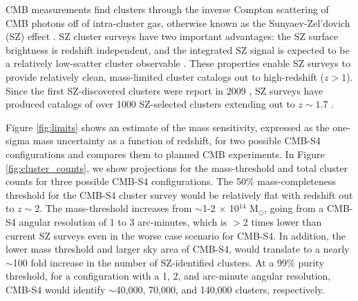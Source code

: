 CMB measurements find clusters through the inverse Compton scattering of CMB photons off of intra-cluster gas, otherwise 
known as the Sunyaev-Zel'dovich (SZ) effect \cite{sunyaev72}. SZ cluster surveys have two important advantages: 
the SZ surface brightness is redshift independent, and the integrated SZ signal is expected to be a relatively 
low-scatter cluster observable \cite{nagai06, nagai07, kravtsov12}.  These properties enable SZ surveys to provide 
relatively clean, mass-limited cluster catalogs out to high-redshift ($z > 1$).  Since the first SZ-discovered clusters were 
report in 2009 \cite{staniszewski09}, SZ surveys have produced catalogs of over 1000 SZ-selected clusters extending out to $z \sim 1.7$ 
\cite{vanderlinde10, reichardt13, hasselfield13, planck13-29, bleem15b, planck15-32}.  


Figure \ref{fig:limits} shows an estimate of the mass sensitivity, expressed as the one-sigma mass uncertainty as a function of redshift, for two possible CMB-S4 configurations and compares them to planned CMB experiments. 
In Figure \ref{fig:cluster_counts}, we show projections for the mass-threshold and total cluster counts for three possible CMB-S4 configurations.  
The 50\% mass-completeness threshold for the CMB-S4 cluster survey would be relatively flat with redshift out to $z \sim 2$.  
The mass-threshold increases from $\sim$1-2 $\times$ 10$^{14}$ M$_{\odot}$, going from a CMB-S4 angular resolution 
of 1 to 3 arc-minutes, which is $>$2 times lower than current SZ surveys even in the worse case scenario for CMB-S4.  
In addition, the lower mass threshold and larger sky area of CMB-S4, would translate to a nearly $\sim$100 fold increase in the 
number of SZ-identified clusters.  At a 99\% purity threshold, for a configuration with a 1, 2, and arc-minute angular 
resolution, CMB-S4 would identify $\sim$40,000, 70,000, and 140,000 clusters, respectively.  


